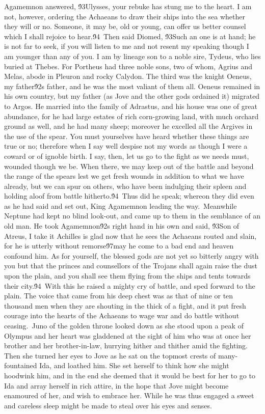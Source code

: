 {Agamemnon answered, \'93Ulysses, your rebuke has stung me to the heart. I am not, however, ordering the Achaeans to draw their ships into the sea whether they will or no. Someone, it may be, old or young, can offer us better counsel which I shall rejoice to hear.\'94\
Then said Diomed, \'93Such an one is at hand; he is not far to seek, if you will listen to me and not resent my speaking though I am younger than any of you. I am by lineage son to a noble sire, Tydeus, who lies buried at Thebes. For Portheus had three noble sons, two of whom, Agrius and Melas, abode in Pleuron and rocky Calydon. The third was the knight Oeneus, my father\'92s father, and he was the most valiant of them all. Oeneus remained in his own country, but my father (as Jove and the other gods ordained it) migrated to Argos. He married into the family of Adrastus, and his house was one of great abundance, for he had large estates of rich corn-growing land, with much orchard ground as well, and he had many sheep; moreover he excelled all the Argives in the use of the spear. You must yourselves have heard whether these things are true or no; therefore when I say well despise not my words as though I were a coward or of ignoble birth. I say, then, let us go to the fight as we needs must, wounded though we be. When there, we may keep out of the battle and beyond the range of the spears lest we get fresh wounds in addition to what we have already, but we can spur on others, who have been indulging their spleen and holding aloof from battle hitherto.\'94\
Thus did he speak; whereon they did even as he had said and set out, King Agamemnon leading the way.\
Meanwhile Neptune had kept no blind look-out, and came up to them in the semblance of an old man. He took Agamemnon\'92s right hand in his own and said, \'93Son of Atreus, I take it Achilles is glad now that he sees the Achaeans routed and slain, for he is utterly without remorse\'97may he come to a bad end and heaven confound him. As for yourself, the blessed gods are not yet so bitterly angry with you but that the princes and counsellors of the Trojans shall again raise the dust upon the plain, and you shall see them flying from the ships and tents towards their city.\'94\
With this he raised a mighty cry of battle, and sped forward to the plain. The voice that came from his deep chest was as that of nine or ten thousand men when they are shouting in the thick of a fight, and it put fresh courage into the hearts of the Achaeans to wage war and do battle without ceasing.\
Juno of the golden throne looked down as she stood upon a peak of Olympus and her heart was gladdened at the sight of him who was at once her brother and her brother-in-law, hurrying hither and thither amid the fighting. Then she turned her eyes to Jove as he sat on the topmost crests of many-fountained Ida, and loathed him. She set herself to think how she might hoodwink him, and in the end she deemed that it would be best for her to go to Ida and array herself in rich attire, in the hope that Jove might become enamoured of her, and wish to embrace her. While he was thus engaged a sweet and careless sleep might be made to steal over his eyes and senses.\
}
